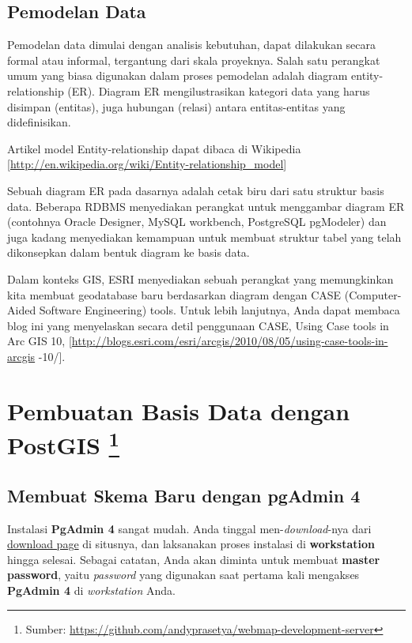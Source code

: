 \documentclass[]{book}
\let\rmarkdownfootnote\footnote%
\def\footnote{\protect\rmarkdownfootnote}
\begin{document}
\hypertarget{pemodelan-data}{%
\subsection{Pemodelan Data}\label{pemodelan-data}}

Pemodelan data dimulai dengan analisis kebutuhan, dapat dilakukan secara formal atau informal, tergantung dari skala proyeknya. Salah satu perangkat umum yang biasa digunakan dalam proses pemodelan adalah diagram entity-relationship (ER). Diagram ER mengilustrasikan kategori data yang harus disimpan (entitas), juga hubungan (relasi) antara entitas-entitas yang didefinisikan.

Artikel model Entity-relationship dapat dibaca di Wikipedia {[}\url{http://en.wikipedia.org/wiki/Entity-relationship_model}{]}

Sebuah diagram ER pada dasarnya adalah cetak biru dari satu struktur basis data. Beberapa RDBMS menyediakan perangkat untuk menggambar diagram ER (contohnya Oracle Designer, MySQL workbench, PostgreSQL pgModeler) dan juga kadang menyediakan kemampuan untuk membuat struktur tabel yang telah dikonsepkan dalam bentuk diagram ke basis data.

Dalam konteks GIS, ESRI menyediakan sebuah perangkat yang memungkinkan kita membuat geodatabase baru berdasarkan diagram dengan CASE (Computer-Aided Software Engineering) tools. Untuk lebih lanjutnya, Anda dapat membaca blog ini yang menyelaskan secara detil penggunaan CASE, Using Case tools in Arc GIS 10, {[}\url{http://blogs.esri.com/esri/arcgis/2010/08/05/using-case-tools-in-arcgis} -10/{]}.

\hypertarget{pembuatan-basis-data-dengan-postgis}{%
\section[Pembuatan Basis Data dengan PostGIS ]{\texorpdfstring{Pembuatan Basis Data dengan PostGIS \footnote{Sumber: \url{https://github.com/andyprasetya/webmap-development-server}}}{Pembuatan Basis Data dengan PostGIS }}\label{pembuatan-basis-data-dengan-postgis}}

\hypertarget{membuat-skema-baru-dengan-pgadmin-4}{%
\subsection{Membuat Skema Baru dengan pgAdmin 4}\label{membuat-skema-baru-dengan-pgadmin-4}}

Instalasi \textbf{PgAdmin 4} sangat mudah. Anda tinggal men-\emph{download}-nya dari \href{https://www.pgadmin.org/download/}{download page} di situsnya, dan laksanakan proses instalasi di \textbf{workstation} hingga selesai. Sebagai catatan, Anda akan diminta untuk membuat \textbf{master password}, yaitu \emph{password} yang digunakan saat pertama kali mengakses \textbf{PgAdmin 4} di \emph{workstation} Anda.
\end{document}
